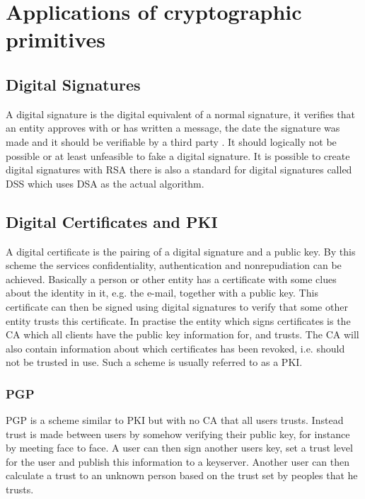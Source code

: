 \documentclass[pdftex,english,10pt,b5paper,twoside]{book}
\begin{document}
\section{Applications of cryptographic primitives}

\subsection{Digital Signatures}
A digital signature is the digital equivalent of a normal signature, it
verifies that an entity approves with or has written a message, the date the
signature was made and it should be verifiable by a third party \cite[p.
379]{stallings}. It should logically not be possible or at least unfeasible to
fake a digital signature. It is possible to create digital signatures with
\ac{RSA} there is also a standard for digital signatures called \ac{DSS} which
uses \ac{DSA} as the actual algorithm.

\subsection{Digital Certificates and PKI} A digital certificate is the pairing
of a digital signature and a public key\cite{stallings}.  By this scheme the
services confidentiality, authentication and nonrepudiation can be achieved.
Basically a person or other entity has a certificate with some clues about the
identity in it, e.g. the e-mail, together with a public key. This certificate
can then be signed using digital signatures to verify that some other entity
trusts this certificate. In practise the entity which signs certificates is the
\ac{CA} which all clients have the public key information for, and trusts. The
\ac{CA} will also contain information about which certificates has been
revoked, i.e. should not be trusted in use. Such a scheme is usually referred
to as a \ac{PKI}.

\subsubsection{PGP} \ac{PGP} is a scheme similar to \ac{PKI} but with no
\ac{CA} that all users trusts\cite{stallings}. Instead trust is made between
users by somehow verifying their public key, for instance by meeting face to
face. A user can then sign another users key, set a trust level for the user
and publish this information to a keyserver. Another user can then calculate a
trust to an unknown person based on the trust set by peoples that he trusts.
\end{document}
